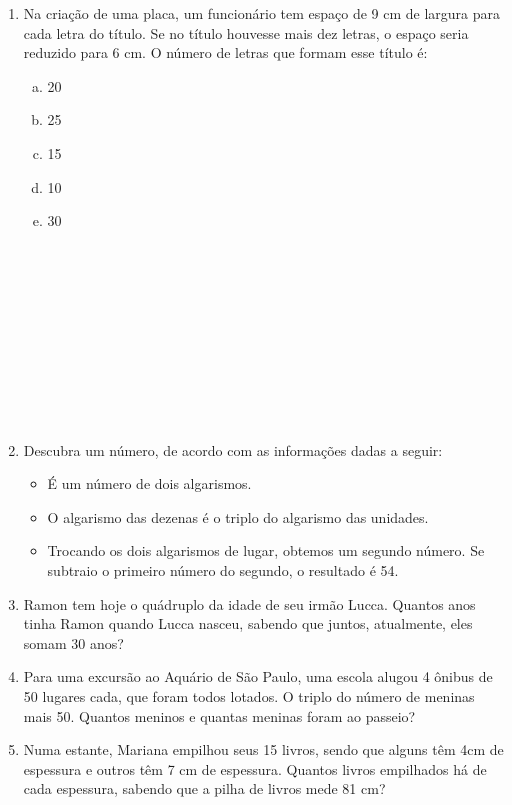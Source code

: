 \documentclass[a4paper,14pt]{article}
\begin{document}
\begin{multicols}{2}
\begin{enumerate}
        \item Na criação de uma placa, um funcionário tem espaço de 9 cm de largura para cada letra do título. Se no título houvesse mais dez letras, o espaço seria reduzido para 6 cm. O número de letras que formam esse título é:
        \begin{enumerate}[a)]
        	\item 20
        	\item 25
        	\item 15
        	\item 10
        	\item 30
        	\\\\\\\\\\\\\\\\\\\\\\
        \end{enumerate}
        \item Descubra um número, de acordo com as informações dadas a seguir:
        \begin{itemize}
        	\item É um número de dois algarismos.
        	\item O algarismo das dezenas é o triplo do algarismo das unidades.
        	\item Trocando os dois algarismos de lugar, obtemos um segundo número. Se subtraio o primeiro número do segundo, o resultado é 54.
        \end{itemize}
        \newpage
        \item Ramon tem hoje o quádruplo da idade de seu irmão Lucca. Quantos anos tinha Ramon quando Lucca nasceu, sabendo que juntos, atualmente, eles somam 30 anos?
        \vspace{22cm}
        \item Para uma excursão ao Aquário de São Paulo, uma escola alugou 4 ônibus de 50 lugares cada, que foram todos lotados. O triplo do número de meninas mais 50. Quantos meninos e quantas meninas foram ao passeio?
        \vspace{22cm}
        \item Numa estante, Mariana empilhou seus 15 livros, sendo que alguns têm 4cm de espessura e outros têm 7 cm de espessura. Quantos livros empilhados há de cada espessura, sabendo que a pilha de livros mede 81 cm? 

\end{enumerate}
\end{multicols}
\end{document}
